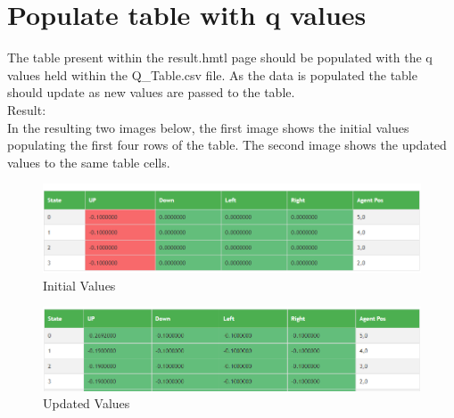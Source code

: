\section{Populate table with q values}
The table present within the result.hmtl page should be populated with the q values held within the Q\_Table.csv file. As the data is populated the table should update as new values are passed to the table.\\
Result:\\
In the resulting two images below, the first image shows the initial values populating the first four rows of the table. The second image shows the updated values to the same table cells.
\begin{figure}[H]
	\centering
	\includegraphics[width=1\linewidth]{img/Qtable1st}
	\caption{Initial Values}
	\label{fig:qtable1st}
\end{figure}
\begin{figure}[H]
	\centering
	\includegraphics[width=1\linewidth]{img/QtableUpdate}
	\caption{Updated Values}
	\label{fig:qtableupdate}
\end{figure}

